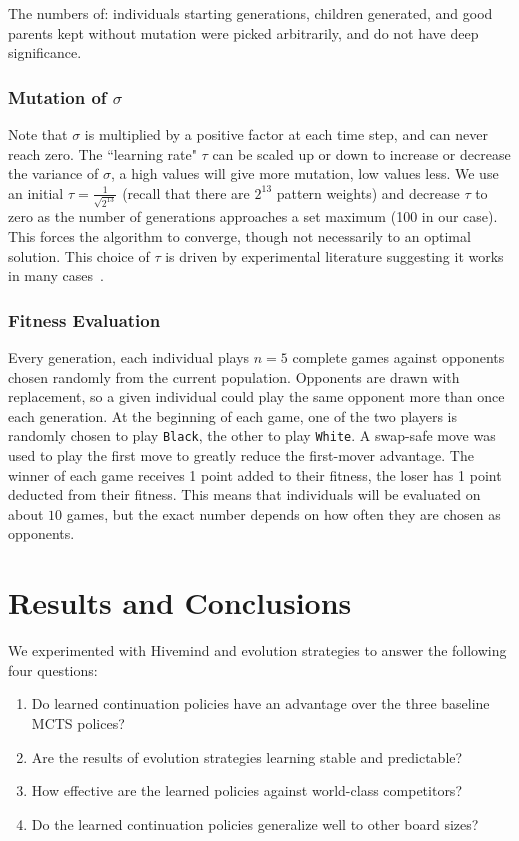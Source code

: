 \documentclass{acm_proc_article-sp}
\newcommand{\hblack}{\texttt{Black}}
\newcommand{\hwhite}{\texttt{White}}
\begin{document}
The numbers of:  individuals starting generations, children generated, and good parents kept without mutation
were picked arbitrarily, and do not have deep significance.

\subsubsection*{Mutation of $\sigma$}
Note that $\sigma$ is multiplied by a positive factor at each time step, and can never reach zero. 
The ``learning rate" $\tau$  can be scaled up or down to increase or decrease the variance of $\sigma$, a high values will give more mutation, low values less. 
We use an initial $\tau = \frac{1}{\sqrt{2^{13}}}$ (recall that there are $2^{13}$  pattern weights) and decrease $\tau$ to zero 
as the number of generations approaches a set maximum (100 in our case). 
This forces the algorithm to converge, though not necessarily to an optimal solution. 
This choice of $\tau$ is driven by experimental literature suggesting it works in many cases~\cite{Beyer:2007}.

\subsubsection*{Fitness Evaluation}

Every generation, each individual plays $n=5$ complete games against opponents chosen  randomly from the current population.
Opponents are drawn with replacement, so a given individual could play the same opponent more than once each generation. 
At the beginning of each game, one of the two players is randomly chosen to play \hblack, the other to play \hwhite. 
A swap-safe move was used to play the first move to greatly reduce the first-mover advantage. 
The winner of each game receives 1 point added to their fitness, the loser has 1 point deducted from their fitness.
This means that individuals will be evaluated on about $10$ games, but the exact number depends on how often they are
chosen as opponents.

\section{Results and Conclusions}\label{results}

We experimented with Hivemind and evolution strategies to answer the following four questions:
\begin{enumerate}
\item Do learned continuation policies have an advantage over the three baseline MCTS polices?
\item Are the results of evolution strategies learning stable and predictable?
\item How effective are the learned policies against world-class competitors?
\item Do the learned continuation policies generalize well to other board sizes?
\end{enumerate}
\end{document}
